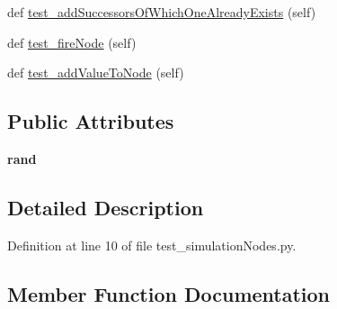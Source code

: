 \begin{DoxyCompactItemize}
\item 
def \hyperlink{class_n_e_a_t___py_genetics_1_1_n_e_a_t_1_1_tests_1_1_simulation_genome_tests_1_1test__simulatiod8e854bf66539833796699d238a883fa_a5db57231e1465f7659a5875e7ca4bf8e}{test\+\_\+add\+Successors\+Of\+Which\+One\+Already\+Exists} (self)
\item 
def \hyperlink{class_n_e_a_t___py_genetics_1_1_n_e_a_t_1_1_tests_1_1_simulation_genome_tests_1_1test__simulatiod8e854bf66539833796699d238a883fa_aba98791f76639d8e17987dfbfd544ce2}{test\+\_\+fire\+Node} (self)
\item 
def \hyperlink{class_n_e_a_t___py_genetics_1_1_n_e_a_t_1_1_tests_1_1_simulation_genome_tests_1_1test__simulatiod8e854bf66539833796699d238a883fa_a9bd84563b74b73f13f5578c7373ec6a8}{test\+\_\+add\+Value\+To\+Node} (self)
\end{DoxyCompactItemize}
\subsection*{Public Attributes}
\begin{DoxyCompactItemize}
\item 
{\bfseries rand}\hypertarget{class_n_e_a_t___py_genetics_1_1_n_e_a_t_1_1_tests_1_1_simulation_genome_tests_1_1test__simulatiod8e854bf66539833796699d238a883fa_a58ee9548720e0cbc77056697727a0e74}{}\label{class_n_e_a_t___py_genetics_1_1_n_e_a_t_1_1_tests_1_1_simulation_genome_tests_1_1test__simulatiod8e854bf66539833796699d238a883fa_a58ee9548720e0cbc77056697727a0e74}

\end{DoxyCompactItemize}


\subsection{Detailed Description}


Definition at line 10 of file test\+\_\+simulation\+Nodes.\+py.



\subsection{Member Function Documentation}
